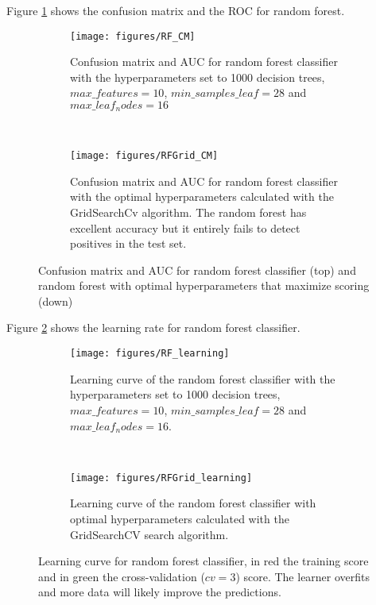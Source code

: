 \documentclass[11pt]{article}
\theoremstyle{definition}
\theoremstyle{remark}
\begin{document}
Figure \ref{fig:rf_cm} shows the confusion matrix and the ROC for random forest. 
\begin{figure}[H]
    \centering
    \begin{subfigure}[t]{.8\textwidth}
        \centering
        \texttt{[image: figures/RF\_CM]}
        \caption{Confusion matrix and AUC for random forest classifier with the hyperparameters set to 1000 decision trees, $max\_features= 10$, $min\_samples\_leaf=28$ and $max\_leaf_nodes=16$}
    \end{subfigure}
    ~ 
    \begin{subfigure}[t]{.8\textwidth}
        \centering
        \texttt{[image: figures/RFGrid\_CM]}
        \caption{Confusion matrix and AUC for random forest classifier with the optimal hyperparameters calculated with the GridSearchCv algorithm. The random forest has excellent accuracy but it entirely fails to detect positives in the test set.}
    \end{subfigure}%
    
    \caption{Confusion matrix and AUC for random forest classifier (top) and random forest with optimal hyperparameters that maximize scoring (down)} \label{fig:rf_cm}
\end{figure}

Figure \ref{fig:rf_learning} shows the learning rate for random forest classifier. 
\begin{figure}[H]
    \centering
    \begin{subfigure}[t]{.8\textwidth}
        \centering
        \texttt{[image: figures/RF\_learning]}
        \caption{Learning curve of the random forest classifier with the hyperparameters set to 1000 decision trees, $max\_features= 10$, $min\_samples\_leaf=28$ and $max\_leaf_nodes=16$.}
    \end{subfigure}
    ~ 
    \begin{subfigure}[t]{.8\textwidth}
        \centering
        \texttt{[image: figures/RFGrid\_learning]}
        \caption{Learning curve of the random forest classifier with optimal hyperparameters calculated with the GridSearchCV search algorithm.}
    \end{subfigure}%
    
    \caption{Learning curve for random forest classifier, in red the training score and in green the cross-validation ($cv=3$) score. The learner overfits and more data will likely improve the predictions.} \label{fig:rf_learning}
\end{figure}
\end{document}
